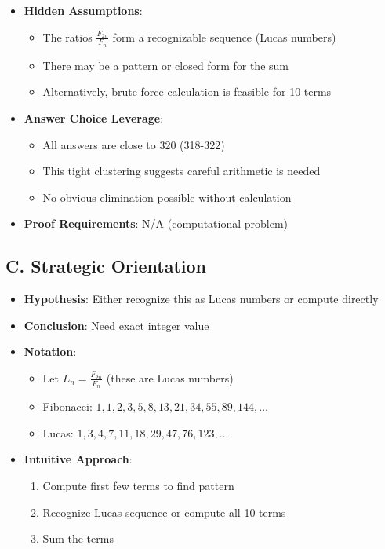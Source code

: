 \documentclass[12pt]{article}
\begin{document}
\begin{problemconfigbox}
\begin{itemize}[leftmargin=*]
    \item \textbf{Hidden Assumptions}: 
    \begin{itemize}
        \item The ratios $\frac{F_{2n}}{F_n}$ form a recognizable sequence (Lucas numbers)
        \item There may be a pattern or closed form for the sum
        \item Alternatively, brute force calculation is feasible for 10 terms
    \end{itemize}
    
    \item \textbf{Answer Choice Leverage}: 
    \begin{itemize}
        \item All answers are close to 320 (318-322)
        \item This tight clustering suggests careful arithmetic is needed
        \item No obvious elimination possible without calculation
    \end{itemize}
    
    \item \textbf{Proof Requirements}: N/A (computational problem)
\end{itemize}

\subsection*{C. Strategic Orientation}
\begin{itemize}[leftmargin=*]
    \item \textbf{Hypothesis}: Either recognize this as Lucas numbers or compute directly
    
    \item \textbf{Conclusion}: Need exact integer value
    
    \item \textbf{Notation}: 
    \begin{itemize}
        \item Let $L_n = \frac{F_{2n}}{F_n}$ (these are Lucas numbers)
        \item Fibonacci: $1, 1, 2, 3, 5, 8, 13, 21, 34, 55, 89, 144, \ldots$
        \item Lucas: $1, 3, 4, 7, 11, 18, 29, 47, 76, 123, \ldots$
    \end{itemize}
    
    \item \textbf{Intuitive Approach}: 
    \begin{enumerate}
        \item Compute first few terms to find pattern
        \item Recognize Lucas sequence or compute all 10 terms
        \item Sum the terms
    \end{enumerate}
    

\end{itemize}
\end{problemconfigbox}
\end{document}

